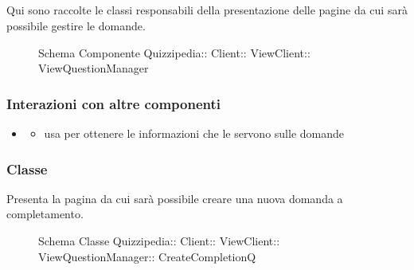 \subsection{}
Qui sono raccolte le classi responsabili della presentazione delle pagine da cui sarà possibile gestire le domande.
\begin{figure}[H]
\centering
\noindent{}
\caption[Schema Componente ViewQuestionManager]{Schema Componente Quizzipedia:: Client:: ViewClient:: ViewQuestionManager}
\end{figure}
\subsubsection{Interazioni con altre componenti}
\begin{itemize}
\item {}
\begin{itemize}
\item usa  per ottenere le informazioni che le servono sulle domande
\end{itemize}
\end{itemize}
\subsubsection{Classe }
Presenta la pagina da cui sarà possibile creare una nuova domanda a completamento.
\begin{figure}[H]
\centering
\noindent{}
\caption[Schema Classe CreateCompletionQ]{Schema Classe Quizzipedia:: Client:: ViewClient:: ViewQuestionManager:: CreateCompletionQ}
\end{figure}
